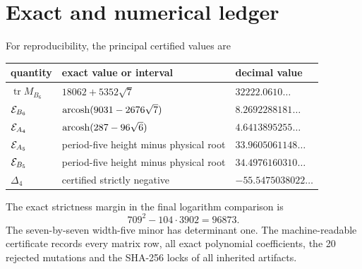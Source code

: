\appendix
\section{Exact and numerical ledger}

For reproducibility, the principal certified values are
\begin{center}
\begin{tabular}{@{}lll@{}}
\toprule
quantity & exact value or interval & decimal value\\
\midrule
\(\operatorname{tr}M_{B_6}\) & \(18062+5352\sqrt7\) & \(32222.0610\ldots\)\\
\(\mathcal E_{B_6}\) & \(\operatorname{arcosh}(9031-2676\sqrt7)\) & \(8.2692288181\ldots\)\\
\(\mathcal E_{A_4}\) & \(\operatorname{arcosh}(287-96\sqrt6)\) & \(4.6413895255\ldots\)\\
\(\mathcal E_{A_5}\) & period-five height minus physical root & \(33.9605061148\ldots\)\\
\(\mathcal E_{B_5}\) & period-five height minus physical root & \(34.4976160310\ldots\)\\
\(\Delta_4\) & certified strictly negative & \(-55.5475038022\ldots\)\\
\bottomrule
\end{tabular}
\end{center}

The exact strictness margin in the final logarithm comparison is
\[
 709^2-104\cdot3902=96873.
\]
The seven-by-seven width-five minor has determinant one.  The machine-readable
certificate records every matrix row, all exact polynomial coefficients,
the 20 rejected mutations and the SHA-256 locks of all inherited artifacts.
